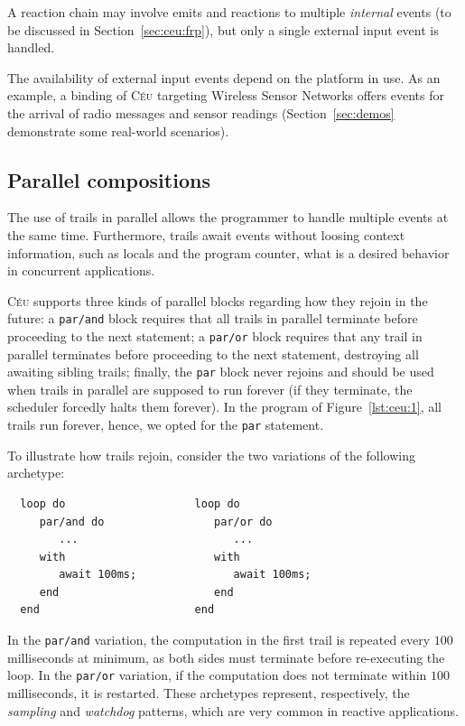 \documentclass{sigplan-proc}
\newcommand{\2}{\;\;}
\newcommand{\5}{\;\;\;\;\;}
\newcommand{\CEU}{\textsc{C\'{e}u}}
\newcommand{\code}[1] {{\small{\texttt{#1}}}}
\begin{document}
A reaction chain may involve emits and reactions to multiple \emph{internal} 
events (to be discussed in Section~\ref{sec:ceu:frp}), but only a single 
external input event is handled.

The availability of external input events depend on the platform in 
use.
As an example, a binding of \CEU{} targeting Wireless Sensor Networks offers 
events for the arrival of radio messages and sensor readings 
(Section~\ref{sec:demos} demonstrate some real-world scenarios).

\subsection{Parallel compositions}
\label{sec:ceu:par}

The use of trails in parallel allows the programmer to handle multiple events 
at the same time.
Furthermore, trails await events without loosing context information, such as 
locals and the program counter, what is a desired behavior in concurrent 
applications.~\cite{sync_async.cooperative}

\CEU{} supports three kinds of parallel blocks regarding how they rejoin in the 
future:
a \code{par/and} block requires that all trails in parallel terminate before 
proceeding to the next statement;
a \code{par/or} block requires that any trail in parallel terminates before 
proceeding to the next statement, destroying all awaiting sibling trails;
finally, the \code{par} block never rejoins and should be used when trails in 
parallel are supposed to run forever (if they terminate, the scheduler forcedly 
halts them forever).
In the program of Figure~\ref{lst:ceu:1}, all trails run forever, hence, we 
opted for the \code{par} statement.

To illustrate how trails rejoin, consider the two variations of the following 
archetype:
{\small
\begin{verbatim}
  loop do                    loop do
     par/and do                 par/or do
        ...                        ...
     with                       with
        await 100ms;               await 100ms;
     end                        end
  end                        end
\end{verbatim}
}
In the \code{par/and} variation, the computation in the first trail is repeated 
every $100$ milliseconds at minimum, as both sides must terminate before 
re-executing the loop.
In the \code{par/or} variation, if the computation does not terminate within 
$100$ milliseconds, it is restarted.
These archetypes represent, respectively, the \emph{sampling} and 
\emph{watchdog} patterns, which are very common in reactive applications.
\end{document}
